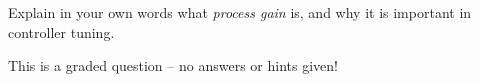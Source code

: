 

Explain in your own words what {\it process gain} is, and why it is important in controller tuning.

\vfil

\eject






This is a graded question -- no answers or hints given!











